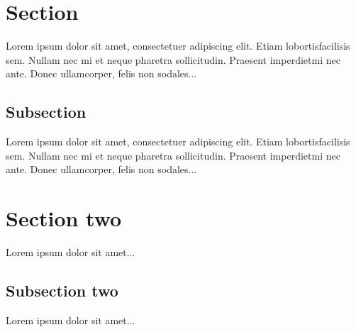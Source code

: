 \documentclass{article}
\begin{document}
\doublespacing
\tableofcontents
\singlespacing
\section{Section}
Lorem ipsum dolor sit amet, consectetuer adipiscing elit. Etiam lobortisfacilisis sem. Nullam nec mi et neque pharetra sollicitudin. Praesent imperdietmi nec ante. Donec ullamcorper, felis non sodales... 
\subsection{Subsection} 
Lorem ipsum dolor sit amet, consectetuer adipiscing elit. Etiam lobortisfacilisis sem. Nullam nec mi et neque pharetra sollicitudin. Praesent imperdietmi nec ante. Donec ullamcorper, felis non sodales... 
\section{Section two}
Lorem ipsum dolor sit amet...
\subsection{Subsection two}
Lorem ipsum dolor sit amet...
\end{document}

